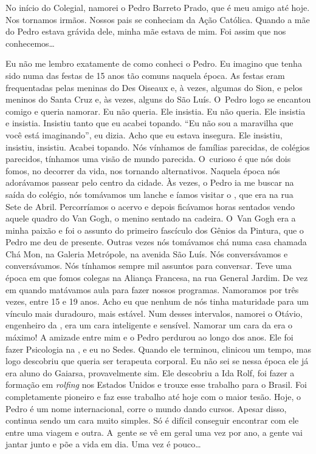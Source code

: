 No início do Colegial, namorei o Pedro Barreto Prado, que é meu amigo
até hoje. Nos tornamos irmãos. Nossos pais se conheciam da Ação
Católica. Quando a mãe do Pedro estava grávida dele, minha mãe estava de
mim. Foi assim que nos conhecemos…

Eu não me lembro exatamente de como conheci o Pedro. Eu imagino que
tenha sido numa das festas de 15 anos tão comuns naquela época. As
festas eram frequentadas pelas meninas do Des Oiseaux e, à vezes,
algumas do Sion, e pelos meninos do Santa Cruz e, às vezes, alguns do
São Luís. O~Pedro logo se encantou comigo e queria namorar. Eu não
queria. Ele insistia. Eu não queria. Ele insistia e insistia. Insistiu
tanto que eu acabei topando. ``Eu não sou a maravilha que você está
imaginando'', eu dizia. Acho que eu estava insegura. Ele insistiu,
insistiu, insistiu. Acabei topando. Nós vínhamos de famílias parecidas,
de colégios parecidos, tínhamos uma visão de mundo parecida. O~curioso é
que nós dois fomos, no decorrer da vida, nos tornando alternativos.
Naquela época nós adorávamos passear pelo centro da cidade. Às vezes, o
Pedro ia me buscar na saída do colégio, nós tomávamos um lanche e íamos
visitar o , que era na rua Sete de Abril. Percorríamos o acervo e
depois ficávamos horas sentados vendo aquele quadro do Van Gogh, o
menino sentado na cadeira. O~Van Gogh era a minha paixão e foi o assunto
do primeiro fascículo dos Gênios da Pintura, que o Pedro me deu de
presente. Outras vezes nós tomávamos chá numa casa chamada Chá Mon, na
Galeria Metrópole, na avenida São Luís. Nós conversávamos e
conversávamos. Nós tínhamos sempre mil assuntos para conversar. Teve uma
época em que fomos colegas na Aliança Francesa, na rua General Jardim.
De vez em quando matávamos aula para fazer nossos programas. Namoramos
por três vezes, entre 15 e 19 anos. Acho eu que nenhum de nós tinha
maturidade para um vínculo mais duradouro, mais estável. Num desses
intervalos, namorei o Otávio, engenheiro da , era um cara
inteligente e sensível. Namorar um cara da  era o máximo! A amizade
entre mim e o Pedro perdurou ao longo dos anos. Ele foi fazer Psicologia
na , e eu no Sedes. Quando ele terminou, clinicou um tempo, mas logo
descobriu que queria ser terapeuta corporal. Eu não sei se nessa época
ele já era aluno do Gaiarsa, provavelmente sim. Ele descobriu a Ida
Rolf, foi fazer a formação em \emph{rolfing} nos Estados Unidos e trouxe
esse trabalho para o Brasil. Foi completamente pioneiro e faz esse
trabalho até hoje com o maior tesão. Hoje, o Pedro é um nome
internacional, corre o mundo dando cursos. Apesar disso, continua sendo
um cara muito simples. Só é difícil conseguir encontrar com ele entre
uma viagem e outra. A~gente se vê em geral uma vez por ano, a gente vai
jantar junto e põe a vida em dia. Uma vez é pouco…

